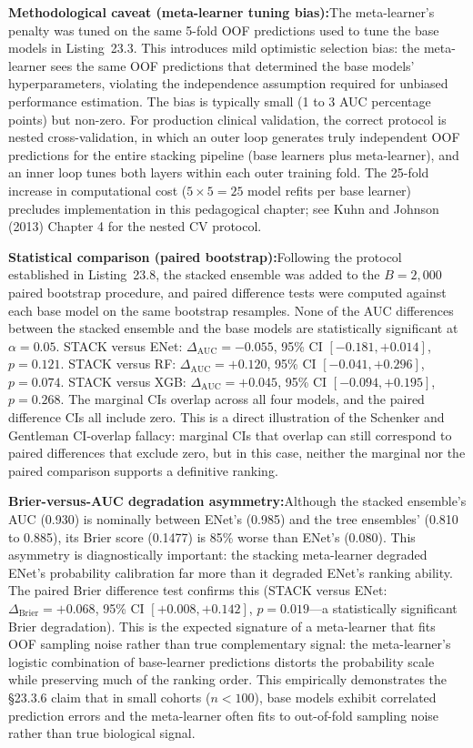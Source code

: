 \documentclass[11pt,oneside]{book}
\begin{document}
\textbf{Methodological caveat (meta-learner tuning bias):}\enspace The meta-learner's penalty was tuned on the same 5-fold OOF predictions used to tune the base models in Listing~23.3. This introduces mild optimistic selection bias: the meta-learner sees the same OOF predictions that determined the base models' hyperparameters, violating the independence assumption required for unbiased performance estimation. The bias is typically small (1 to 3 AUC percentage points) but non-zero. For production clinical validation, the correct protocol is nested cross-validation, in which an outer loop generates truly independent OOF predictions for the entire stacking pipeline (base learners plus meta-learner), and an inner loop tunes both layers within each outer training fold. The 25-fold increase in computational cost ($5 \times 5 = 25$ model refits per base learner) precludes implementation in this pedagogical chapter; see Kuhn and Johnson (2013) \cite{kuhn2013applied} Chapter 4 for the nested CV protocol.

\textbf{Statistical comparison (paired bootstrap):}\enspace Following the protocol established in Listing~23.8, the stacked ensemble was added to the $B = 2{,}000$ paired bootstrap procedure, and paired difference tests were computed against each base model on the same bootstrap resamples. None of the AUC differences between the stacked ensemble and the base models are statistically significant at $\alpha = 0.05$. STACK versus ENet: $\Delta_{\text{AUC}} = -0.055$, 95\% CI $[-0.181, +0.014]$, $p = 0.121$. STACK versus RF: $\Delta_{\text{AUC}} = +0.120$, 95\% CI $[-0.041, +0.296]$, $p = 0.074$. STACK versus XGB: $\Delta_{\text{AUC}} = +0.045$, 95\% CI $[-0.094, +0.195]$, $p = 0.268$. The marginal CIs overlap across all four models, and the paired difference CIs all include zero. This is a direct illustration of the Schenker and Gentleman \cite{schenker2001judging} CI-overlap fallacy: marginal CIs that overlap can still correspond to paired differences that exclude zero, but in this case, neither the marginal nor the paired comparison supports a definitive ranking.

\textbf{Brier-versus-AUC degradation asymmetry:}\enspace Although the stacked ensemble's AUC (0.930) is nominally between ENet's (0.985) and the tree ensembles' (0.810 to 0.885), its Brier score (0.1477) is 85\% worse than ENet's (0.080). This asymmetry is diagnostically important: the stacking meta-learner degraded ENet's probability calibration far more than it degraded ENet's ranking ability. The paired Brier difference test confirms this (STACK versus ENet: $\Delta_{\text{Brier}} = +0.068$, 95\% CI $[+0.008, +0.142]$, $p = 0.019$---a statistically significant Brier degradation). This is the expected signature of a meta-learner that fits OOF sampling noise rather than true complementary signal: the meta-learner's logistic combination of base-learner predictions distorts the probability scale while preserving much of the ranking order. This empirically demonstrates the \S23.3.6 claim that in small cohorts ($n < 100$), base models exhibit correlated prediction errors and the meta-learner often fits to out-of-fold sampling noise rather than true biological signal.
\end{document}
